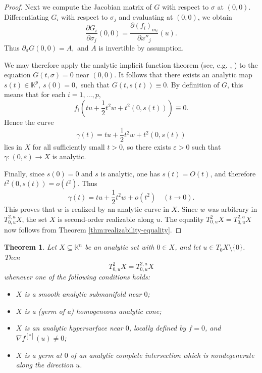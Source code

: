 \documentclass[10pt,reqno]{amsart}
\theoremstyle{break-italic}
\theoremstyle{break-italic}
\theoremstyle{break-italic}
\theoremstyle{break-italic}
\theoremstyle{break-italic}
\theoremstyle{break-italic}
\theoremstyle{break-italic}
\theoremstyle{break-italic}
\newtheorem{theorem}[satz]{Theorem}
\theoremstyle{break-roman}
\theoremstyle{standard}
\theoremstyle{varthm-roman}
\theoremstyle{varthm-italic}
\theoremstyle{varthm-roman-break}
\theoremstyle{varthm-italic-break}
\theoremstyle{varthm-roman-no-punctuation}
\theoremstyle{varthm-italic-no-punctuation}
\numberwithin{equation}{section}
\begin{document}
\begin{proof}
Next we compute the Jacobian matrix of $G$ with respect to $\sigma$ at $(0,0)$.
Differentiating $G_i$ with respect to $\sigma_j$ and evaluating at $(0,0)$, we
obtain
\[
\frac{\partial G_i}{\partial \sigma_j}(0,0)
=
\frac{\partial (f_i)_{m_i}}{\partial x''_j}(u).
\]
Thus 
\(
\partial_\sigma G(0,0)=A,
\)
and $A$ is invertible by assumption.

We may therefore apply the analytic implicit function theorem (see, e.g. \cite[Theorem~2.3.5]{KrPa02}, \cite[Theorem~1.3.5 and Remarks~1.3.6, 1.3.10]{Nara85}) to the equation
\(
G(t,\sigma)=0
\)
near $(0,0)$. It follows that there exists an analytic map
\(
s(t)\in \mathbb K^p, ~s(0)=0,
\)
such that
\(
G(t,s(t))\equiv 0.
\)
By definition of $G$, this means that for each $i=1,\dots,p$,
\[
f_i\!\left(tu+\frac12 t^2w+t^2(0,s(t))\right)\equiv 0.
\]
Hence the curve
\[
\gamma(t)=tu+\frac12 t^2w+t^2(0,s(t))
\]
lies in $X$ for all sufficiently small $t>0$, so there exists $\varepsilon>0$
such that
\(
\gamma:(0,\varepsilon)\to X
\)
is analytic.

Finally, since $s(0)=0$ and $s$ is analytic, one has $s(t)=O(t)$, and therefore
\(
t^2(0,s(t))=o(t^2).
\)
Thus
\[
\gamma(t)=tu+\frac12 t^2w+o(t^2)
\quad (t\to 0).
\]
This proves that $w$ is realized by an analytic curve in $X$. Since $w$ was
arbitrary in $T^{2,a}_{0,u}X$, the set $X$ is second-order realizable along $u$.
The equality
\(
T^2_{0,u}X=T^{2,a}_{0,u}X
\)
now follows from Theorem \ref{thm:realizability-equality}.
\end{proof}



\begin{theorem}\label{thr:some-classes-realizability}
Let $X\subseteq \mathbb K^n$ be an analytic set with $0\in X$, and let
$u\in T_0X\setminus\{0\}$. Then
\[
T^2_{0,u}X=T^{2,a}_{0,u}X
\]
whenever one of the following conditions holds:
\begin{itemize}
\item[(1)] $X$ is a smooth analytic submanifold near $0$;
\item[(2)] $X$ is a (germ of a) homogeneous analytic cone;
\item[(3)] $X$ is an analytic hypersurface near $0$, locally defined by
$f=0$, and $\nabla f^{[\ast]}(u)\neq 0$;
\item[(4)] $X$ is a germ at $0$ of an analytic complete intersection which is
nondegenerate along the direction $u$.
\end{itemize}
\end{theorem}
\end{document}
